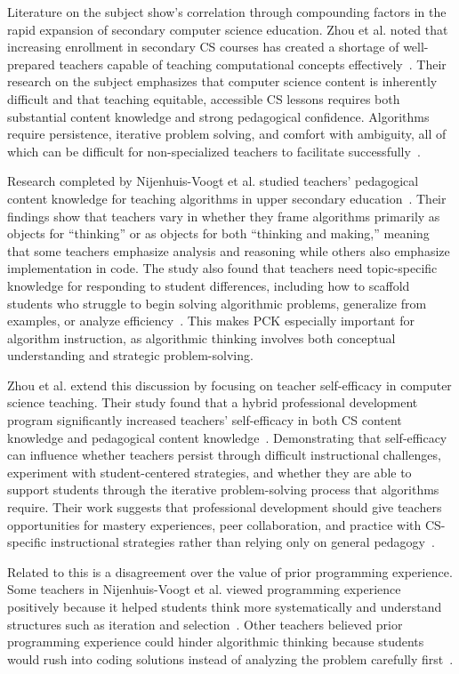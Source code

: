 Literature on the subject show's correlation through compounding factors in the rapid expansion of secondary computer science education.
Zhou et al.
noted that increasing enrollment in secondary CS courses has created a shortage of well-prepared teachers capable of teaching computational concepts effectively~\cite{zhou2020high}.
Their research on the subject emphasizes that computer science content is inherently difficult and that teaching equitable, accessible CS lessons
  requires both substantial content knowledge and strong pedagogical confidence.
Algorithms require persistence, iterative problem solving, and comfort with ambiguity, all of which can be difficult for non-specialized teachers to
  facilitate successfully~\cite{zhou2020high}.

Research completed by Nijenhuis-Voogt et al.
studied teachers' pedagogical content knowledge for teaching algorithms in upper secondary education~\cite{nijenhuis2023teaching}.
Their findings show that teachers vary in whether they frame algorithms primarily as objects for “thinking” or as objects for both “thinking and
  making,” meaning that some teachers emphasize analysis and reasoning while others also emphasize implementation in code.
The study also found that teachers need topic-specific knowledge for responding to student differences, including how to scaffold students who
  struggle to begin solving algorithmic problems, generalize from examples, or analyze efficiency~\cite{nijenhuis2023teaching}.
This makes PCK especially important for algorithm instruction, as algorithmic thinking involves both conceptual understanding and strategic
  problem-solving.

Zhou et al.
extend this discussion by focusing on teacher self-efficacy in computer science teaching.
Their study found that a hybrid professional development program significantly increased teachers' self-efficacy in both CS content knowledge and
  pedagogical content knowledge~\cite{zhou2020high}.
Demonstrating that self-efficacy can influence whether teachers persist through difficult instructional challenges, experiment with student-centered
  strategies, and whether they are able to support students through the iterative problem-solving process that algorithms require.
Their work suggests that professional development should give teachers opportunities for mastery experiences, peer collaboration, and practice with
  CS-specific instructional strategies rather than relying only on general pedagogy~\cite{zhou2020high}.

Related to this is a disagreement over the value of prior programming experience.
Some teachers in Nijenhuis-Voogt et al.
viewed programming experience positively because it helped students think more systematically and understand structures such as iteration and selection~\cite{nijenhuis2023teaching}.
Other teachers believed prior programming experience could hinder algorithmic thinking because students would rush into coding solutions instead of
  analyzing the problem carefully first~\cite{futschek2006algorithmic,bell2014presenting,basu2025using,Oshanova2019}.

